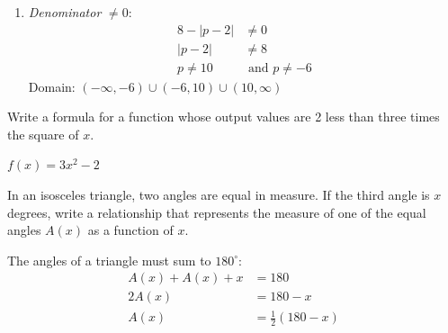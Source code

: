 \documentclass{ximera}
\begin{document}
\begin{problem}
\begin{solution}
\begin{enumerate}
  \item[(g)] \textit{Denominator} $\neq 0$:
  \begin{align*}
    8-|p-2| &\neq 0\\
    |p-2| &\neq 8\\
    p \neq 10 &\text{ and } p \neq -6
  \end{align*}
  Domain: $(-\infty,-6)\cup(-6,10)\cup(10,\infty)$
\end{enumerate}
\end{solution}
\end{problem}


\begin{problem}
Write a formula for a function whose output values are 2 less than three times the square of $x$.

\begin{solution}
$f(x) = 3x^2 - 2$
\end{solution}
\end{problem}


\begin{problem}
In an isosceles triangle, two angles are equal in measure. If the third angle is $x$ degrees, write a relationship that represents the measure of one of the equal angles $A(x)$ as a function of $x$.

\begin{solution}
The angles of a triangle must sum to $180^\circ$:
\begin{align*}
  A(x) + A(x) + x &= 180\\
  2A(x) &= 180 - x\\
  A(x) &= \frac{1}{2}(180-x)
\end{align*}
\end{solution}
\end{problem}
\end{document}
